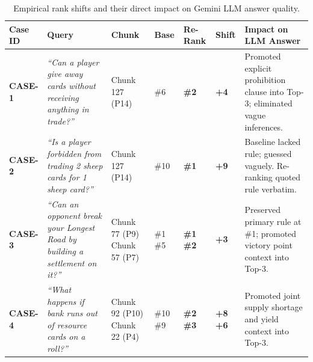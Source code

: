 \documentclass[11pt,a4paper]{article}
\begin{document}
\begin{table}[h!]
\centering
\small
\renewcommand{\arraystretch}{0.92}
\begin{tabularx}{\textwidth}{l p{3.8cm} p{2.7cm} >{\centering\arraybackslash}p{1.0cm} >{\centering\arraybackslash}p{1.3cm} >{\centering\arraybackslash}p{1.0cm} X}
\toprule
\textbf{Case ID} & \textbf{Query} & \textbf{Chunk} & \textbf{Base} & \textbf{Re-Rank} & \textbf{Shift} & \textbf{Impact on LLM Answer} \\
\midrule
\textbf{CASE-1} & \textit{``Can a player give away cards without receiving anything in trade?''} & Chunk 127 (P14) & \#6 & \textbf{\#2} & \textbf{+4} & Promoted explicit prohibition clause into Top-3; eliminated vague inferences. \\
\addlinespace[1pt]
\textbf{CASE-2} & \textit{``Is a player forbidden from trading 2 sheep cards for 1 sheep card?''} & Chunk 127 (P14) & \#10 & \textbf{\#1} & \textbf{+9} & Baseline lacked rule; guessed vaguely. Re-ranking quoted rule verbatim. \\
\addlinespace[1pt]
\textbf{CASE-3} & \textit{``Can an opponent break your Longest Road by building a settlement on it?''} & Chunk 77 (P9) \newline Chunk 57 (P7) & \#1 \newline \#5 & \textbf{\#1} \newline \textbf{\#2} & 0 \newline \textbf{+3} & Preserved primary rule at \#1; promoted victory point context into Top-3. \\
\addlinespace[1pt]
\textbf{CASE-4} & \textit{``What happens if bank runs out of resource cards on a roll?''} & Chunk 92 (P10) \newline Chunk 22 (P4) & \#10 \newline \#9 & \textbf{\#2} \newline \textbf{\#3} & \textbf{+8} \newline \textbf{+6} & Promoted joint supply shortage and yield context into Top-3. \\
\bottomrule
\end{tabularx}
\caption{Empirical rank shifts and their direct impact on Gemini LLM answer quality.}
\label{tab:rank_shifts}
\end{table}

\vspace{-0.6em}
\end{document}
